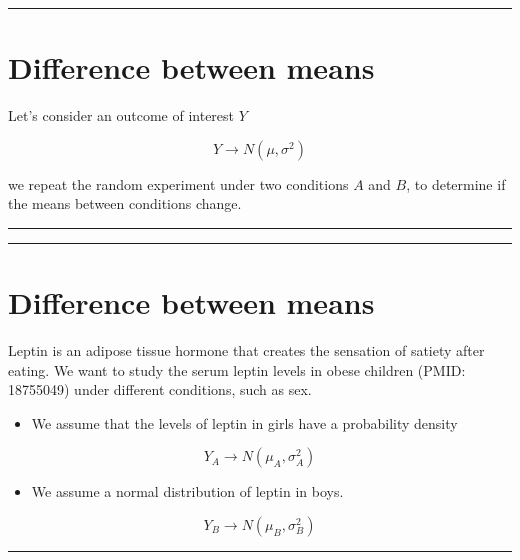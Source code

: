 \documentclass[
]{book}
\providecommand{\tightlist}{%
  \setlength{\itemsep}{0pt}\setlength{\parskip}{0pt}}
\begin{document}
\begin{center}\rule{0.5\linewidth}{0.5pt}\end{center}

\hypertarget{difference-between-means}{%
\section{Difference between means}\label{difference-between-means}}

Let's consider an outcome of interest \(Y\)

\[ Y \rightarrow N(\mu, \sigma^2)\]

we repeat the random experiment under two conditions \(A\) and \(B\), to determine if the means between conditions change.

\begin{center}\rule{0.5\linewidth}{0.5pt}\end{center}

\begin{center}\rule{0.5\linewidth}{0.5pt}\end{center}

\hypertarget{difference-between-means-1}{%
\section{Difference between means}\label{difference-between-means-1}}

Leptin is an adipose tissue hormone that creates the sensation of satiety after eating. We want to study the serum leptin levels in obese children (PMID: 18755049) under different conditions, such as sex.

\begin{itemize}
\tightlist
\item
  We assume that the levels of leptin in girls have a probability density
\end{itemize}

\[Y_A \rightarrow N(\mu_A, \sigma_A^2)\]

\begin{itemize}
\tightlist
\item
  We assume a normal distribution of leptin in boys.
\end{itemize}

\[Y_B \rightarrow N(\mu_B, \sigma_B^2)\]

\begin{center}\rule{0.5\linewidth}{0.5pt}\end{center}
\end{document}
